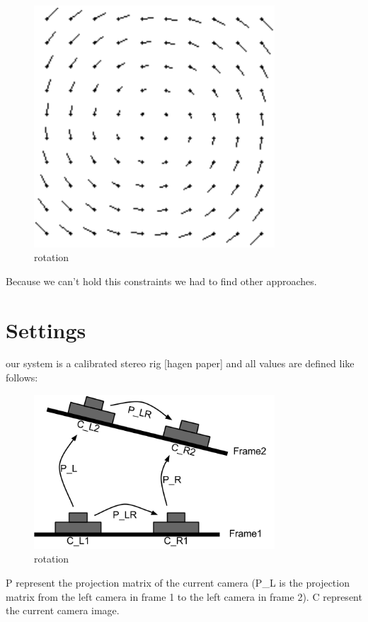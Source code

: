 \documentclass[11pt]{article}
\begin{document}
	\begin{figure}[ht!]
		\centering
		\includegraphics[width=90mm]{images/rotation.png}
		\caption{rotation \label{overflow}}
	\end{figure}
	
	
	Because we can’t hold this constraints we had to find other approaches.
	
	\section{Settings}
	our system is a calibrated stereo rig [hagen paper] and all values are defined like follows:
	
	\begin{figure}[ht!]
		\centering
		\includegraphics[width=90mm]{images/camera setup.png}
		\caption{rotation \label{overflow}}
	\end{figure}

	P represent the projection matrix of the current camera (P\_L is the projection matrix from the left camera in frame 1 to the left camera in frame 2). C represent the current camera image.
\end{document}
